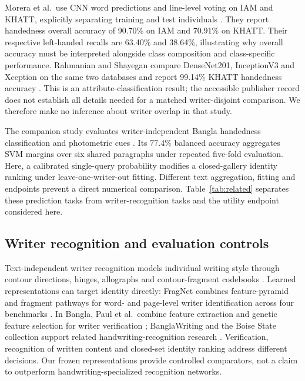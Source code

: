 Morera et al.\ use CNN word predictions and line-level voting on IAM and KHATT, explicitly separating training and test individuals \cite{morera2018handedness}. They report handedness overall accuracy of 90.70\% on IAM and 70.91\% on KHATT. Their respective left-handed recalls are 63.40\% and 38.64\%, illustrating why overall accuracy must be interpreted alongside class composition and class-specific performance. Rahmanian and Shayegan compare DenseNet201, InceptionV3 and Xception on the same two databases and report 99.14\% KHATT handedness accuracy \cite{rahmanian2021handedness}. This is an attribute-classification result; the accessible publisher record does not establish all details needed for a matched writer-disjoint comparison. We therefore make no inference about writer overlap in that study.

The companion study evaluates writer-independent Bangla handedness classification and photometric cues \cite{prappo2026handedness}. Its 77.4\% balanced accuracy aggregates SVM margins over six shared paragraphs under repeated five-fold evaluation. Here, a calibrated single-query probability modifies a closed-gallery identity ranking under leave-one-writer-out fitting. Different text aggregation, fitting and endpoints prevent a direct numerical comparison. Table~\ref{tab:related} separates these prediction tasks from writer-recognition tasks and the utility endpoint considered here.

\subsection{Writer recognition and evaluation controls}
Text-independent writer recognition models individual writing style through contour directions, hinges, allographs and contour-fragment codebooks \cite{bulacu2007text,schomaker2007codebooks}. Learned representations can target identity directly: FragNet combines feature-pyramid and fragment pathways for word- and page-level writer identification across four benchmarks \cite{he2020fragnet}. In Bangla, Paul et al.\ combine feature extraction and genetic feature selection for writer verification \cite{paul2024bangla}; BanglaWriting and the Boise State collection support related handwriting-recognition research \cite{mridha2021banglawriting,majid2018bangla}. Verification, recognition of written content and closed-set identity ranking address different decisions. Our frozen representations provide controlled comparators, not a claim to outperform handwriting-specialized recognition networks.

